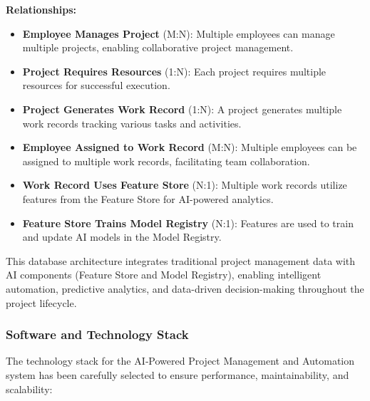 \documentclass[12pt,a4paper]{article}
\begin{document}
\textbf{Relationships:}
\begin{itemize}
    \item \textbf{Employee Manages Project} (M:N): Multiple employees can manage multiple projects, enabling collaborative project management.
    
    \item \textbf{Project Requires Resources} (1:N): Each project requires multiple resources for successful execution.
    
    \item \textbf{Project Generates Work Record} (1:N): A project generates multiple work records tracking various tasks and activities.
    
    \item \textbf{Employee Assigned to Work Record} (M:N): Multiple employees can be assigned to multiple work records, facilitating team collaboration.
    
    \item \textbf{Work Record Uses Feature Store} (N:1): Multiple work records utilize features from the Feature Store for AI-powered analytics.
    
    \item \textbf{Feature Store Trains Model Registry} (N:1): Features are used to train and update AI models in the Model Registry.
\end{itemize}

This database architecture integrates traditional project management data with AI components (Feature Store and Model Registry), enabling intelligent automation, predictive analytics, and data-driven decision-making throughout the project lifecycle.

\newpage
\subsubsection{Software and Technology Stack}
The technology stack for the AI‑Powered Project Management and Automation system has been carefully selected to ensure performance, maintainability, and scalability:
\end{document}
